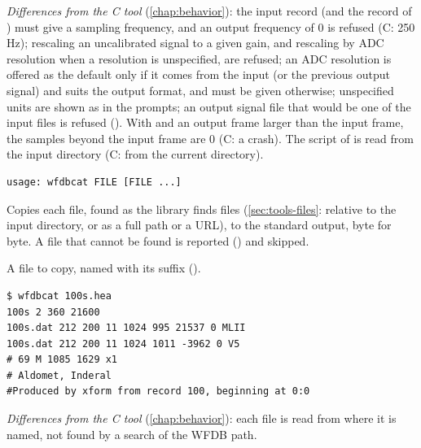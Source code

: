 \textit{Differences from the C tool} (\cref{chap:behavior}): the input record (and the
record of ) must give a sampling frequency, and an output frequency of 0 is refused
(C: 250\,Hz); rescaling an uncalibrated signal to a given gain, and rescaling by ADC
resolution when a resolution is unspecified, are refused; an ADC resolution is offered as
the default only if it comes from the input (or the previous output signal) and suits the
output format, and must be given otherwise; unspecified units are shown as  in the
prompts; an output signal file that would be one of the input files is refused
(). With  and an output
frame larger than the input frame, the samples beyond the input frame are 0 (C: a crash).
The script of  is read from the input directory (C: from the current directory).

\begin{lstlisting}[style=signature,language={}]
usage: wfdbcat FILE [FILE ...]
\end{lstlisting}
Copies each file, found as the library finds files (\cref{sec:tools-files}: relative to the
input directory, or as a full path or a URL), to the standard output, byte for byte. A file
that cannot be found is reported () and skipped.
\begin{params}
\item[FILE] A file to copy, named with its suffix ().
\end{params}
\begin{lstlisting}[style=text]
$ wfdbcat 100s.hea
100s 2 360 21600
100s.dat 212 200 11 1024 995 21537 0 MLII
100s.dat 212 200 11 1024 1011 -3962 0 V5
# 69 M 1085 1629 x1
# Aldomet, Inderal
#Produced by xform from record 100, beginning at 0:0
\end{lstlisting}
\textit{Differences from the C tool} (\cref{chap:behavior}): each file is read from where it
is named, not found by a search of the WFDB path.

